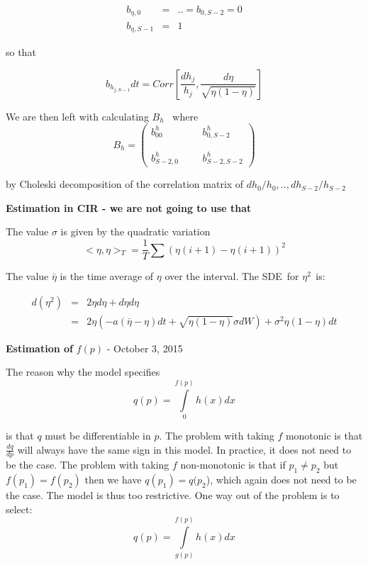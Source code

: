 \documentclass{article}
\begin{document}
\begin{eqnarray*}
b_{\eta ,0} &=&..=b_{0,S-2}=0 \\
b_{\eta ,S-1} &=&1
\end{eqnarray*}

so that

\begin{equation*}
b_{h_{j,S-1}}dt=Corr[\frac{dh_{j}}{h_{j}},\frac{d\eta }{\sqrt{\eta (1-\eta )}%
}]
\end{equation*}%
\bigskip

We are then left with calculating $B_{h}$ \ where%
\begin{equation*}
B_{h}=\left( 
\begin{array}{cccc}
b_{00}^{h} &  &  & b_{0,S-2}^{h} \\ 
&  &  &  \\ 
&  &  &  \\ 
b_{S-2,0}^{h} &  &  & b_{S-2,S-2}^{h}%
\end{array}%
\right)
\end{equation*}

by Choleski decomposition of the correlation matrix of $%
dh_{0}/h_{0},..,dh_{S-2}/h_{S-2}$

\textbf{Estimation in CIR - we are not going to use that}

The value $\sigma $ is given by the quadratic variation 
\begin{equation*}
<\eta ,\eta >_{T}=\frac{1}{T}\sum (\eta (i+1)-\eta (i+1))^{2}
\end{equation*}

The value $\bar{\eta}$ is the time average of $\eta $ over the interval. The
SDE\ for $\eta ^{2\text{ }}$is:

\begin{eqnarray*}
d(\eta ^{2}) &=&2\eta d\eta +d\eta d\eta \\
&=&2\eta (-a(\bar{\eta}-\eta )dt+\sqrt{\eta (1-\eta )}\sigma dW)+\sigma
^{2}\eta (1-\eta )dt
\end{eqnarray*}

\textbf{Estimation of }$f(p)$ - October 3, 2015

The reason why the model specifies 
\begin{equation*}
q(p)=\int\limits_{0}^{f(p)}h(x)dx
\end{equation*}

is that $q$ must be differentiable in $p$. The problem with taking $f$
monotonic is that $\frac{dq}{dp}$ will always have the same sign in this
model. In practice, it does not need to be the case. The problem with taking 
$f$ non-monotonic is that if $p_{1}\neq p_{2}$ but $f(p_{1})=f(p_{2})$ then
we have $q(p_{1})=q(p_{2}$), which again does not need to be the case. The
model is thus too restrictive. One way out of the problem is to select:%
\begin{equation*}
q(p)=\int\limits_{g(p)}^{f(p)}h(x)dx
\end{equation*}
\end{document}

